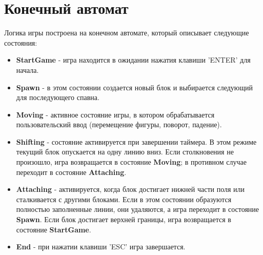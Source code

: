 \documentclass{article}
\begin{document}
\section{Конечный автомат}
Логика игры построена на конечном автомате, который описывает следующие состояния:
\begin{itemize}
    \item \textbf{StartGame} - игра находится в ожидании нажатия клавиши 'ENTER' для начала.
    \item \textbf{Spawn} - в этом состоянии создается новый блок и выбирается следующий для последующего спавна.
    \item \textbf{Moving} - активное состояние игры, в котором обрабатывается пользовательский ввод (перемещение фигуры, поворот, падение).
    \item \textbf{Shifting} - состояние активируется при завершении таймера. В этом режиме текущий блок опускается на одну линию вниз. Если столкновения не произошло, игра возвращается в состояние \textbf{Moving}; в противном случае переходит в состояние \textbf{Attaching}.
    \item \textbf{Attaching} - активируется, когда блок достигает нижней части поля или сталкивается с другими блоками. Если в этом состоянии образуются полностью заполненные линии, они удаляются, а игра переходит в состояние \textbf{Spawn}. Если блок достигает верхней границы, игра возвращается в состояние \textbf{StartGame}.
    \item \textbf{End} - при нажатии клавиши 'ESC' игра завершается.
\end{itemize}
\end{document}

